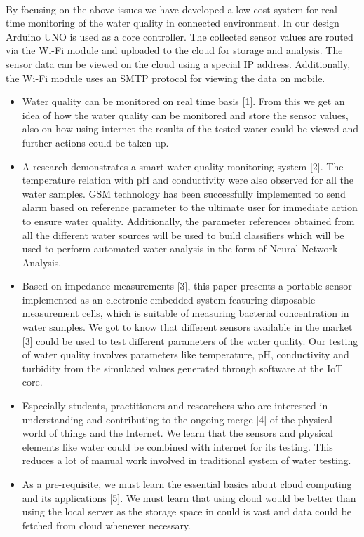 \paragraph{}
By focusing on the above issues we have developed a low cost system for real time monitoring of the water quality in connected environment. In our design Arduino UNO is used as a core controller. The collected sensor values are routed via the Wi-Fi module and uploaded to the cloud for storage and analysis. The sensor data can be viewed on the cloud using a special IP address. Additionally, the Wi-Fi module uses an SMTP protocol for viewing the data on mobile.
\begin{itemize}
\item Water quality can be monitored on real time basis [1]. From this we get an idea of how the water quality can be monitored and store the sensor values, also on how using internet the results of the tested water could be viewed and further actions could be taken up.
\item A research demonstrates a smart water quality monitoring system [2]. The temperature relation with pH and conductivity were also observed for all the water samples. GSM technology has been successfully implemented to send alarm based on reference parameter to the ultimate user for immediate action to ensure water quality. Additionally, the parameter references obtained from all the different water sources will be used to build classifiers which will be used to perform automated water analysis in the form of Neural Network Analysis.
\item Based on impedance measurements [3], this paper presents a portable sensor implemented as an electronic embedded system featuring disposable measurement cells, which is suitable of measuring bacterial concentration in water samples. We got to know that different sensors available in the market [3] could be used to test different parameters of the water quality. Our testing of water quality involves parameters like temperature, pH, conductivity and turbidity from the simulated values generated through software at the IoT core.
\item Especially students, practitioners and researchers who are interested in understanding and contributing to the ongoing merge [4] of the physical world of things and the Internet. We learn that the sensors and physical elements like water could be combined with internet for its testing. This reduces a lot of manual work involved in traditional system of water testing. 
\item As a pre-requisite, we must learn the essential basics about cloud computing and its applications [5]. We must learn that using cloud would be better than using the local server as the storage space in could is vast and data could be fetched from cloud whenever necessary.

\end{itemize}
